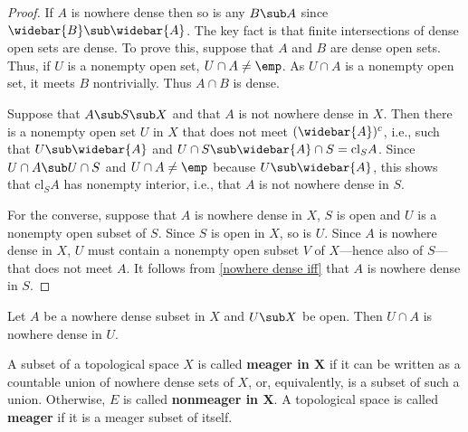 \begin{proof}
If $A$ is nowhere dense then so is any $B\sub A$ since $\widebar{B}\sub\widebar{A}$. The key fact is that finite intersections of dense open sets are dense. To prove this, suppose that $A$ and $B$ are dense open sets. Thus, if $U$ is a nonempty open set, $U\cap A\neq\emp$. As $U\cap A$ is a nonempty open set, it meets $B$ nontrivially. Thus $A\cap B$ is dense.\par
Suppose that $A\sub S\sub X$ and that $A$ is not nowhere dense in $X$. Then there is a nonempty open set $U$ in $X$ that does not meet $(\widebar{A})^c$, i.e., such that $U\sub\widebar{A}$ and $U\cap S\sub\widebar{A}\cap S=\mathrm{cl}_SA$. Since $U\cap A\sub U\cap S$ and $U\cap A\neq\emp$ because $U\sub\widebar{A}$, this shows that $\mathrm{cl}_SA$ has nonempty interior, i.e., that $A$ is not nowhere dense in $S$.\par
For the converse, suppose that $A$ is nowhere dense in $X$, $S$ is open and $U$ is a nonempty open subset of $S$. Since $S$ is open in $X$, so is $U$. Since $A$ is nowhere dense in $X$, $U$ must contain a nonempty open subset $V$ of $X$---hence also of $S$---that does not meet $A$. It follows from \cref{nowhere dense iff} that $A$ is nowhere dense in $S$.
\end{proof}
\begin{corollary}\label{nowhere dense hereditary to open set}
Let $A$ be a nowhere dense subset in $X$ and $U\sub X$ be open. Then $U\cap A$ is nowhere dense in $U$. 
\end{corollary}
\begin{definition}
A subset of a topological space $X$ is called \textbf{meager in $\bm{X}$} if it can be written as a countable union of nowhere dense sets of $X$, or, equivalently, is a subset of such a union. Otherwise, $E$ is called \textbf{nonmeager in $\bm{X}$}. A topological space is called \textbf{meager} if it is a meager subset of itself.
\end{definition}

